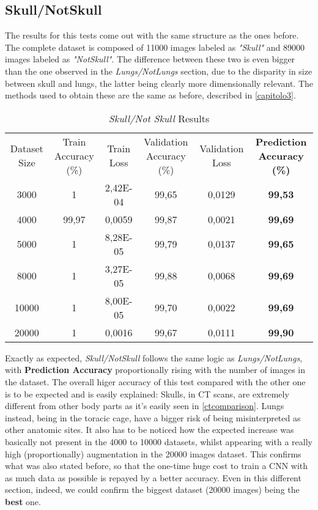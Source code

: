 \documentclass[../main.tex]{subfiles}
\begin{document}
\subsection{Skull/NotSkull}
The results for this tests come out with the same structure as the ones before. The complete dataset is composed of 11000 images labeled as \textit{"Skull"} and 89000 images labeled as \textit{"NotSkull"}. The difference between these two is even bigger than the one observed in the \textit{Lungs/NotLungs} section, due to the disparity in size between skull and lungs, the latter being clearly more dimensionally relevant. The methods used to obtain these are the same as before, described in \ref{capitolo3}.

\begin{table}[]
\begin{tabular}{cccccc}
Dataset Size & Train Accuracy (\%) & Train Loss & Validation Accuracy (\%) & Validation Loss & \textbf{Prediction Accuracy (\%)} \\
3000         & 1                   & 2,42E-04   & 99,65                    & 0,0129          & \textbf{99,53}                    \\
4000         & 99,97               & 0,0059     & 99,87                    & 0,0021          & \textbf{99,69}                    \\
5000         & 1                   & 8,28E-05   & 99,79                    & 0,0137          & \textbf{99,65}                    \\
8000         & 1                   & 3,27E-05   & 99,88                    & 0,0068          & \textbf{99,69}                    \\
10000        & 1                   & 8,00E-05   & 99,70                    & 0,0022          & \textbf{99,69}                    \\
20000        & 1                   & 0,0016     & 99,67                    & 0,0111          & \textbf{99,90}                   
\end{tabular}
\caption{\textit{Skull/Not Skull} Results}
\label{table:SNSres}
\end{table}

Exactly as expected, \textit{Skull/NotSkull} follows the same logic as \textit{Lungs/NotLungs}, with \textbf{Prediction Accuracy} proportionally rising with the number of images in the dataset. The overall higer accuracy of this test compared with the other one is to be expected and is easily explained: Skulls, in CT scans, are extremely different from other body parts as it's easily seen in \ref{ctcomparison}. Lungs instead, being in the toracic cage, have a bigger risk of being misinterpreted as other anatomic sites. It also has to be noticed how the expected increase was basically not present in the 4000 to 10000 datasets, whilst appearing with a really high (proportionally) augmentation in the 20000 images dataset. This confirms what was also stated before, so that the one-time huge cost to train a CNN with as much data as possible is repayed by a better accuracy. Even in this different section, indeed, we could confirm the biggest dataset (20000 images) being the \textbf{best} one. 
\end{document}
